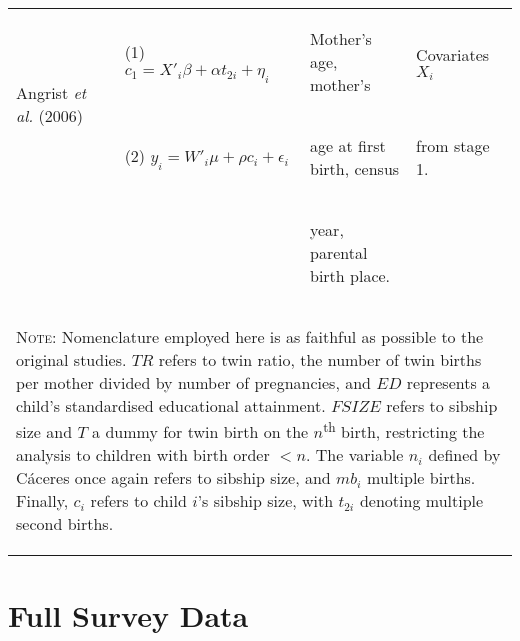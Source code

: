 \documentclass{article}[11pt,subeqn]
\begin{document}
\begin{spacing}{1.25}
\begin{center}
\begin{rotate}{90}
\begin{tabular}{lp{4mm}lll}
\multirow{2}{*}{Angrist \emph{et al.} (2006)} &  &
(1)  $c_1=X'_i\beta+\alpha t_{2i}+\eta_i$ &
\begin{small}Mother's age, mother's \end{small} & 
\begin{small}Covariates $X_i$\end{small}
\\
& &
(2) $y_i=W'_i\mu+\rho c_i + \epsilon_i$ &  
\begin{small}age at first birth, census \end{small} &
\begin{small}from stage 1.\end{small}
\\
& & &
\begin{small}year, parental birth place.\end{small}&
\\
\bottomrule 
\multicolumn{5}{p{19.2cm}}{\setstretch{0.9}\begin{footnotesize}\textsc{Note:} Nomenclature employed here is as faithful as possible to the original studies.  $TR$ refers to twin ratio, the number of twin births per mother divided by number of pregnancies, and $ED$ represents a child's standardised educational attainment. $FSIZE$ refers to sibship size and $T$ a dummy for twin birth on the $n$\textsuperscript{th} birth, restricting the analysis to children with birth order $<n$. The variable $n_i$ defined by C\'aceres once again refers to sibship size, and $mb_i$ multiple births. Finally, $c_i$ refers to child $i$'s sibship size, with $t_{2i}$ denoting multiple second births.\end{footnotesize}}\\
\end{tabular}
\end{rotate}
\label{tab:litrev}
\end{center}

\section{Full Survey Data}
\label{scn:surveys}


\end{spacing}
\end{document}
